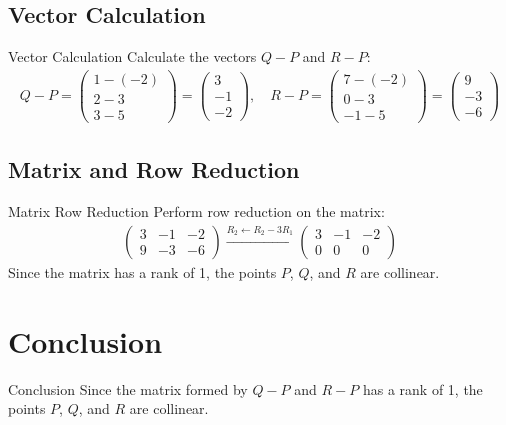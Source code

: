 \documentclass{beamer}
\numberwithin{equation}{section}
\begin{document}
\subsection{Vector Calculation}
\begin{frame}{Vector Calculation}
    Calculate the vectors $ Q - P $ and $ R - P $:
    \begin{align}
    Q - P = \begin{pmatrix} 1 - (-2) \\ 2 - 3 \\ 3 - 5 \end{pmatrix} = \begin{pmatrix} 3 \\ -1 \\ -2 \end{pmatrix}, \quad R - P = \begin{pmatrix} 7 - (-2) \\ 0 - 3 \\ -1 - 5 \end{pmatrix} = \begin{pmatrix} 9 \\ -3 \\ -6 \end{pmatrix}
    \end{align}
\end{frame}

\subsection{Matrix and Row Reduction}
\begin{frame}{Matrix Row Reduction}
    Perform row reduction on the matrix:
    \begin{align}
    \begin{pmatrix} 3 & -1 & -2 \\ 9 & -3 & -6 \end{pmatrix} 
    \xrightarrow{R_2 \leftarrow R_2 - 3 R_1} \begin{pmatrix} 3 & -1 & -2 \\ 0 & 0 & 0 \end{pmatrix}
    \end{align}
    Since the matrix has a rank of 1, the points $ P $, $ Q $, and $ R $ are collinear.
\end{frame}

\section{Conclusion}
\begin{frame}{Conclusion}
    Since the matrix formed by $ Q - P $ and $ R - P $ has a rank of 1, the points $ P $, $ Q $, and $ R $ are collinear.
\end{frame}
\end{document}
